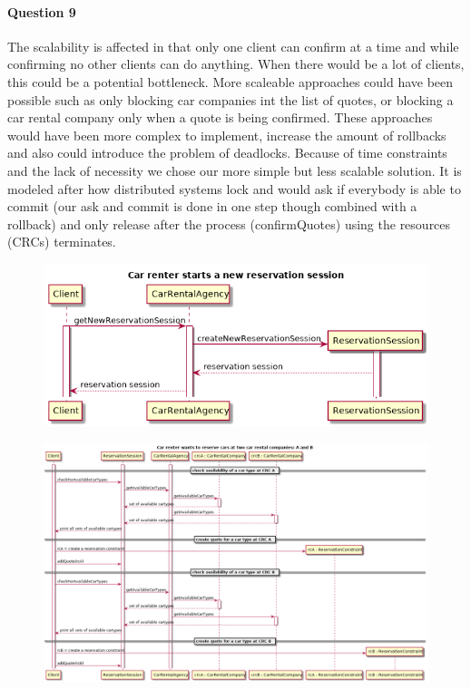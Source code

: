 \documentclass{ds-report}
\begin{document}
	\paragraph{Question 9} 
	The scalability is affected in that only one client can confirm at a time and while confirming no other clients can do anything. When there would be a lot of clients, this could be a potential bottleneck. 
	More scaleable approaches could have been possible such as only blocking car companies int the list of quotes, or blocking a car rental company only when a quote is being confirmed.
	These approaches would have been more complex to implement, increase the amount of rollbacks and also could introduce the problem of deadlocks.
	Because of time constraints and the lack of necessity we chose our more simple but less scalable solution.
	It is modeled after how distributed systems lock and would ask if everybody is able to commit (our ask and commit is done in one step though combined with a rollback) and only release after the process (confirmQuotes) using the resources (CRCs) terminates.
	
	\clearpage
	
	
	\begin{landscape}
		\begin{figure}
			\centering
			\includegraphics[width=\paperwidth]{../diagrams/sequenceDiagrams/startSession.png}
		\end{figure}
	\end{landscape}
	
\clearpage
	\begin{landscape}
		\begin{figure}
			\centering
			\includegraphics[width=\paperwidth]{../diagrams/sequenceDiagrams/reserveCars.png}
		\end{figure}
	\end{landscape}
	
\end{document}
